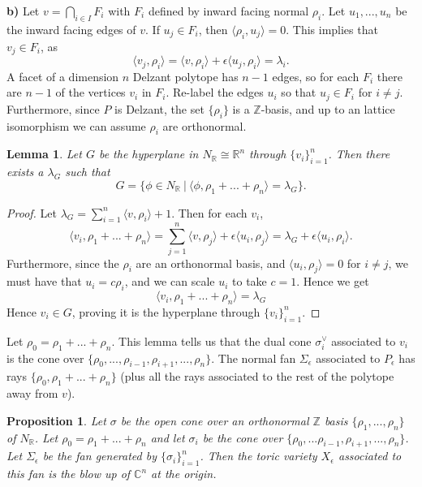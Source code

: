 \documentclass{article}
\newtheorem{lemma}{Lemma}
\newtheorem{prop}{Proposition}
\newcommand{\C}{\mathbb{C}}
\newcommand{\Z}{\mathbb{Z}}
\newcommand{\R}{\mathbb{R}}
\begin{document}
\noindent \textbf{b)} Let $v = \bigcap_{i\in I} F_i$ with $F_i$ defined by inward facing normal $\rho_i$. Let $u_1,...,u_n$ be the inward facing edges of $v$. If $u_j \in F_i$, then $\langle \rho_i, u_j \rangle = 0$. This implies that $v_j \in F_i$, as
$$\langle v_j, \rho_i \rangle = \langle v, \rho_i \rangle + \epsilon \langle u_j, \rho_i\rangle = \lambda_i.$$
A facet of a dimension $n$ Delzant polytope has $n-1$ edges, so for each $F_i$ there are $n-1$ of the vertices $v_i$ in $F_i$. Re-label the edges $u_i$ so that $u_j \in F_i$ for $i\neq j$. Furthermore, since $P$ is Delzant, the set $\{\rho_i\}$ is a $\Z$-basis, and up to an lattice isomorphism we can assume $\rho_i$ are orthonormal. 
\begin{lemma}
	Let $G$ be the hyperplane in $N_\R\cong\R^n$ through $\{v_i\}_{i=1}^n$. Then there exists a $\lambda_G$ such that
	$$G = \{\phi \in N_\R ~|~ \langle \phi, \rho_1+...+\rho_n \rangle = \lambda_G\}.$$
\end{lemma}
\begin{proof}
	Let $\lambda_G = \sum_{i=1}^n \langle v, \rho_i \rangle+1$. Then for each $v_i$,
	$$\langle v_i, \rho_1+...+\rho_n \rangle = \sum_{j=1}^n \langle v, \rho_j \rangle + \epsilon \langle u_i,\rho_j\rangle = \lambda_G + \epsilon \langle u_i,\rho_i \rangle.$$
	Furthermore, since the $\rho_i$ are an orthonormal basis, and $\langle u_i,\rho_j\rangle =0$ for $i\neq j$, we must have  that $u_i = c\rho_i$, and we can scale $u_i$ to take $c=1$. Hence we get 
	$$\langle v_i, \rho_1+...+\rho_n\rangle = \lambda_G$$
	Hence $v_i\in G$, proving it is the hyperplane through $\{v_i\}_{i=1}^n$.
\end{proof}
Let $\rho_0=\rho_1+...+\rho_n$. This lemma tells us that the dual cone $\sigma_i^\vee$ associated to $v_i$ is the cone over $\{\rho_0,...,\rho_{i-1},\rho_{i+1},...,\rho_n\}$. The normal fan $\Sigma_\epsilon$ associated to $P_\epsilon$ has rays $\{\rho_0,\rho_1+...+\rho_n\}$ (plus all the rays associated to the rest of the polytope away from $v$).
\begin{prop}
	Let $\sigma$ be the open cone over an orthonormal $\Z$ basis $\{\rho_1,...,\rho_n\}$ of $N_\R$. Let $\rho_0 = \rho_1+...+\rho_n$ and let $\sigma_i$ be the cone over $\{\rho_0,...\rho_{i-1},\rho_{i+1},...,\rho_n\}$. Let $\Sigma_\epsilon$ be the fan generated by $\{\sigma_i\}_{i=1}^n$. Then the toric variety $X_\epsilon$ associated to this fan is the blow up of $\C^n$ at the origin.
\end{prop}
\end{document}
